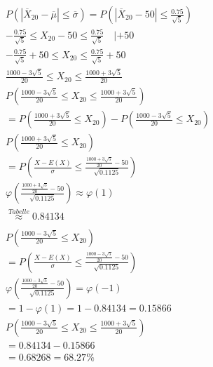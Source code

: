 \begin{align*}
    P\left(\left|\overline{X}_{20} - \overline{\mu}\right| \leq \overline{\sigma}\right)
    = P\left(\left|\overline{X}_{20} - 50\right| \leq \frac{0.75}{\sqrt{5}}\right)                                  \\
    -\frac{0.75}{\sqrt{5}} \leq X_{20} - 50 \leq \frac{0.75}{\sqrt{5}} \quad | + 50                                 \\
    -\frac{0.75}{\sqrt{5}} + 50 \leq X_{20} \leq \frac{0.75}{\sqrt{5}} + 50                                         \\
    \frac{1000 - 3\sqrt{5}}{20} \leq X_{20} \leq \frac{1000 + 3\sqrt{5}}{20}                                        \\
    P\left(\frac{1000 - 3\sqrt{5}}{20} \leq X_{20} \leq \frac{1000 + 3\sqrt{5}}{20}\right)                          \\
    = P\left(\frac{1000 + 3\sqrt{5}}{20} \leq X_{20}\right) - P\left(\frac{1000 - 3\sqrt{5}}{20} \leq X_{20}\right) \\
    P\left(\frac{1000 + 3\sqrt{5}}{20} \leq X_{20}\right)                                                           \\
    =P\left(\frac{X - E(X)}{\sigma} \leq \frac{\frac{1000 + 3\sqrt{5}}{20} - 50}{\sqrt{0.1125}}\right)              \\
    \varphi\left(\frac{\frac{1000 + 3\sqrt{5}}{20} - 50}{\sqrt{0.1125}}\right) \approx \varphi\left(1\right)        \\
    \overset{Tabelle}{\approx} 0.84134                                                                              \\\\
    P\left(\frac{1000 - 3\sqrt{5}}{20} \leq X_{20}\right)                                                           \\
    = P\left(\frac{X - E(X)}{\sigma} \leq \frac{\frac{1000 - 3\sqrt{5}}{20} - 50}{\sqrt{0.1125}}\right)             \\
    \varphi\left(\frac{\frac{1000 - 3\sqrt{5}}{20} - 50}{\sqrt{0.1125}}\right) = \varphi(-1)                        \\
    = 1 - \varphi(1) = 1 - 0.84134 = 0.15866                                                                        \\
    P\left(\frac{1000 - 3\sqrt{5}}{20} \leq X_{20} \leq \frac{1000 + 3\sqrt{5}}{20}\right)                          \\
    = 0.84134 - 0.15866                                                                                             \\
    = 0.68268 = 68.27\%
\end{align*}

